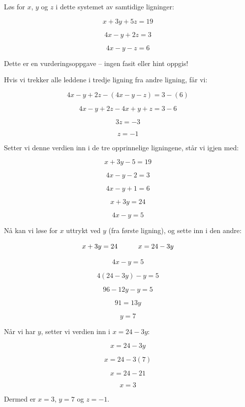 

Løs for $x$, $y$ og $z$ i dette systemet av samtidige ligninger:

$$x + 3y + 5z = 19$$

$$4x - y + 2z = 3$$

$$4x - y - z = 6$$

\vfil 

\eject






Dette er en vurderingsoppgave -- ingen fasit eller hint oppgis!







Hvis vi trekker alle leddene i tredje ligning fra andre ligning, får vi:

$$4x - y + 2z - (4x - y - z) = 3 - (6)$$

$$4x - y + 2z - 4x + y + z = 3 - 6$$

$$3z = -3$$

$$z = -1$$

Setter vi denne verdien inn i de tre opprinnelige ligningene, står vi igjen med:

$$x + 3y - 5 = 19$$

$$4x - y - 2 = 3$$

$$4x - y + 1 = 6$$

\vskip 10pt

$$x + 3y = 24$$

$$4x - y = 5$$

\vskip 10pt

Nå kan vi løse for $x$ uttrykt ved $y$ (fra første ligning), og sette inn i den andre:

$$x + 3y = 24 \hskip 30pt x = 24 - 3y$$

$$4x - y = 5$$

$$4(24 - 3y) - y = 5$$

$$96 - 12y - y = 5$$

$$91 = 13y$$

$$y = 7$$

\filbreak

Når vi har $y$, setter vi verdien inn i $x = 24 - 3y$:

$$x = 24 - 3y$$

$$x = 24 - 3(7)$$

$$x = 24 - 21$$

$$x = 3$$

\vskip 10pt

Dermed er $x = 3$, $y = 7$ og $z = -1$.



